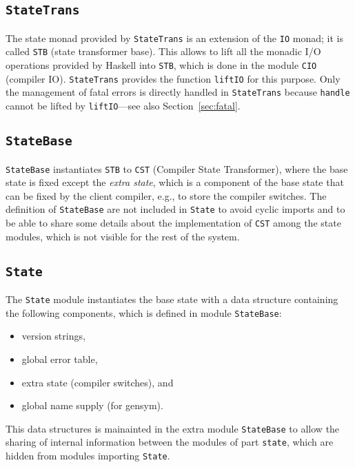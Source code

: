 \documentclass{report}
\newcommand{\code}[1]{\texttt{#1}}
\begin{document}
\subsection{\code{StateTrans}}
\label{sec:StateTrans}

The state monad provided by \code{StateTrans} is an extension of the \code{IO}
monad; it is called \code{STB} (state transformer base). This allows to lift
all the monadic I/O operations provided by Haskell into \code{STB}, which is
done in the module \code{CIO} (compiler IO).  \code{StateTrans} provides the
function \code{liftIO} for this purpose. Only the management of fatal errors
is directly handled in \code{StateTrans} because \code{handle} cannot be
lifted by \code{liftIO}---see also Section~\ref{sec:fatal}.

\subsection{\code{StateBase}}
\label{sec:StateBase}

\code{StateBase} instantiates \code{STB} to \code{CST} (Compiler State
Transformer), where the base state is fixed except the \emph{extra state},
which is a component of the base state that can be fixed by the client
compiler, e.g., to store the compiler switches.  The definition of
\code{StateBase} are not included in \code{State} to avoid cyclic imports and
to be able to share some details about the implementation of \code{CST} among
the state modules, which is not visible for the rest of the system.

\subsection{\code{State}}
\label{sec:State}

The \code{State} module instantiates the base state with a data structure
containing the following components, which is defined in module
\code{StateBase}:
%
\begin{itemize}
\item version strings,
\item global error table,
\item extra state (compiler switches), and
\item global name supply (for gensym).
\end{itemize}
%
This data structures is mainainted in the extra module \code{StateBase} to
allow the sharing of internal information between the modules of part
\code{state}, which are hidden from modules importing \code{State}.
\end{document}
